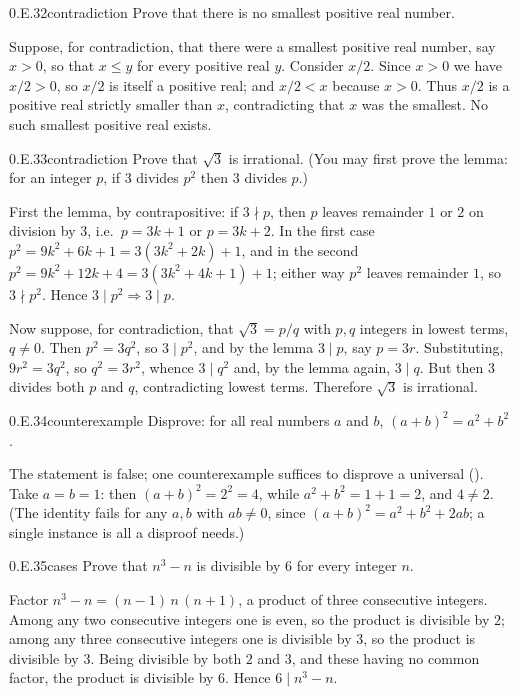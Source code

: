 \documentclass[main.tex]{subfiles}
\begin{document}
\begin{Exercise}{0.E.32}{contradiction}
Prove that there is no smallest positive real number.
\end{Exercise}
\begin{Solution}
Suppose, for contradiction, that there were a smallest positive real number, say $x>0$, so that
$x\le y$ for every positive real $y$. Consider $x/2$. Since $x>0$ we have $x/2>0$, so $x/2$ is itself
a positive real; and $x/2<x$ because $x>0$. Thus $x/2$ is a positive real strictly smaller than $x$,
contradicting that $x$ was the smallest. No such smallest positive real exists.
\end{Solution}

\begin{Exercise}{0.E.33}{contradiction}
Prove that $\sqrt3$ is irrational. (You may first prove the lemma: for an integer $p$, if $3$ divides
$p^2$ then $3$ divides $p$.)
\end{Exercise}
\begin{Solution}
First the lemma, by contrapositive: if $3\nmid p$, then $p$ leaves remainder $1$ or $2$ on division by
$3$, i.e.\ $p=3k+1$ or $p=3k+2$. In the first case $p^2=9k^2+6k+1=3(3k^2+2k)+1$, and in the second
$p^2=9k^2+12k+4=3(3k^2+4k+1)+1$; either way $p^2$ leaves remainder $1$, so $3\nmid p^2$. Hence
$3\mid p^2\Rightarrow 3\mid p$.

Now suppose, for contradiction, that $\sqrt3=p/q$ with $p,q$ integers in lowest terms, $q\neq0$. Then
$p^2=3q^2$, so $3\mid p^2$, and by the lemma $3\mid p$, say $p=3r$. Substituting, $9r^2=3q^2$, so
$q^2=3r^2$, whence $3\mid q^2$ and, by the lemma again, $3\mid q$. But then $3$ divides both $p$ and
$q$, contradicting lowest terms. Therefore $\sqrt3$ is irrational.
\end{Solution}

\begin{Exercise}{0.E.34}{counterexample}
Disprove: for all real numbers $a$ and $b$, $(a+b)^2=a^2+b^2$.
\end{Exercise}
\begin{Solution}
The statement is false; one counterexample suffices to disprove a universal (). Take
$a=b=1$: then $(a+b)^2=2^2=4$, while $a^2+b^2=1+1=2$, and $4\neq2$. (The identity fails for any
$a,b$ with $ab\neq0$, since $(a+b)^2=a^2+b^2+2ab$; a single instance is all a disproof needs.)
\end{Solution}

\begin{Exercise}{0.E.35}{cases}
Prove that $n^3-n$ is divisible by $6$ for every integer $n$.
\end{Exercise}
\begin{Solution}
Factor $n^3-n=(n-1)\,n\,(n+1)$, a product of three consecutive integers. Among any two consecutive
integers one is even, so the product is divisible by $2$; among any three consecutive integers one is
divisible by $3$, so the product is divisible by $3$. Being divisible by both $2$ and $3$, and these
having no common factor, the product is divisible by $6$. Hence $6\mid n^3-n$.
\end{Solution}
\end{document}
